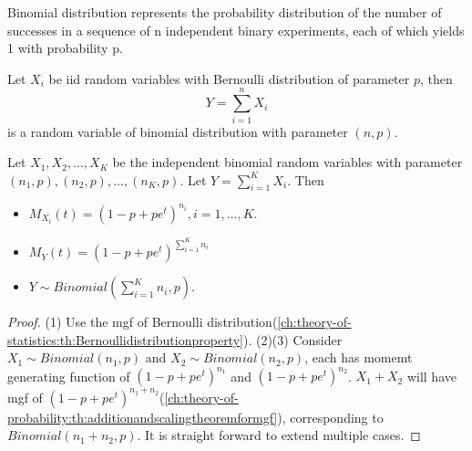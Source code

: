 \begin{refsection}
\begin{remark}[interpretation]
Binomial distribution represents the probability distribution of the number of successes in a sequence of n independent binary experiments, each of which yields 1 with probability p.
\end{remark}  

\begin{remark}
Let $X_i$ be iid random variables with Bernoulli distribution of parameter $p$, then 
$$Y = \sum_{i=1}^n X_i$$ is a random variable of binomial distribution with parameter $(n,p)$. 
\end{remark}


\begin{lemma}
Let $X_1,X_2,...,X_K$ be the independent binomial random variables with parameter $(n_1,p),(n_2,p),...,(n_K,p)$. Let
$Y = \sum_{i=1}^K X_i $. Then
\begin{itemize}
	\item $M_{X_i}(t) = (1-p + pe^t)^{n_i},i=1,...,K$.
	\item $M_Y(t) = (1-p + pe^t)^{\sum_{i=1}^K n_i}$
	\item $Y \sim Binomial(\sum_{i=1}^K n_i, p).$
\end{itemize}
\end{lemma}
\begin{proof}
(1) Use the mgf of Bernoulli distribution(\autoref{ch:theory-of-statistics:th:Bernoullidistributionproperty}).
(2)(3)
Consider $X_1\sim Binomial(n_1,p)$ and $X_2\sim Binomial(n_2,p)$, each has momemt generating function of $(1-p+pe^t)^{n_1}$ and $(1-p+pe^t)^{n_2}$. $X_1+X_2$ will have mgf of 
$(1-p+pe^t)^{n_1+n_2}$(\autoref{ch:theory-of-probability:th:additionandscalingtheoremformgf}), corresponding to $Binomial(n_1+n_2,p)$. It is straight forward to extend multiple cases. 
\end{proof}



\end{refsection}
